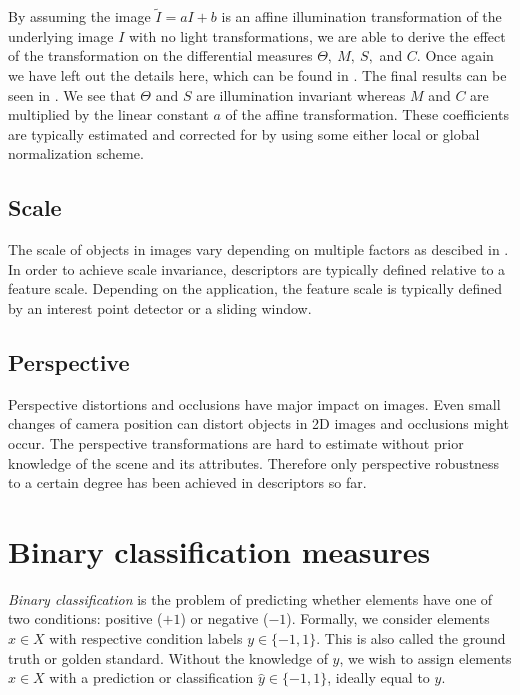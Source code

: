 \documentclass[thesis.tex]{subfiles}
\begin{document}
By assuming the image $\tilde{I} = a I +  b$ is an affine illumination transformation of the underlying image $I$ with no light transformations, we are able to derive the effect of the transformation on the differential measures $\Theta,~M,~S,$ and $C$. Once again we have left out the details here, which can be found in . The final results can be seen in . We see that $\Theta$ and $S$ are illumination invariant whereas $M$ and $C$ are multiplied by the linear constant $a$ of the affine transformation. These coefficients are typically estimated and corrected for by using some either local or global normalization scheme.

\subsection{Scale}
\label{sec:scaleInvariance}

The scale of objects in images vary depending on multiple factors as descibed in . In order to achieve scale invariance, descriptors are typically defined relative to a feature scale. Depending on the application, the feature scale is typically defined by an interest point detector or a sliding window.

\subsection{Perspective}
Perspective distortions and occlusions have major impact on images. Even small changes of camera position can distort objects in 2D images and occlusions might occur. The perspective transformations are hard to estimate without prior knowledge of the scene and its attributes. Therefore only perspective robustness to a certain degree has been achieved in descriptors so far.
%
\section{Binary classification measures}
\label{sec:binaryClassificationMeasures}
%
\emph{Binary classification} is the problem of predicting whether elements have one of two conditions: positive ($+1$) or negative ($-1$). Formally, we consider elements $x \in X$ with respective condition labels $y \in \{-1, 1\}$. This is also called the ground truth or golden standard. Without the knowledge of $y$, we wish to assign elements $x \in X$ with a prediction or classification $\hat{y} \in \{-1, 1\}$, ideally equal to $y$.
\end{document}
